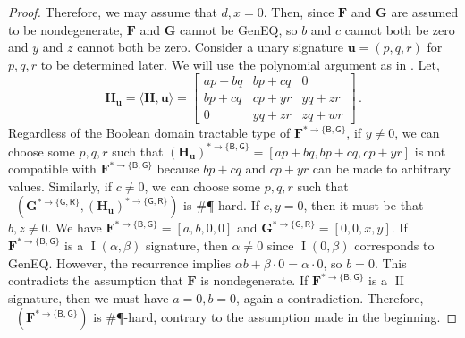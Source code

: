 \documentclass[11pt]{article}
\DeclareMathOperator{\holbs}{Holant^*_2}
\DeclareMathOperator{\typei}{I}
\DeclareMathOperator{\typeii}{II}
\newcommand{\db}{\mathsf{B}}
\newcommand{\dg}{\mathsf{G}}
\newcommand{\dr}{\mathsf{R}}
\newcommand{\geneq}{\textsf{GenEQ}\xspace}
\newcommand{\sph}{\#\P-hard\xspace}
\newcommand{\domres}[1]{
  ^{*\to\{#1\}}
}
\begin{document}
\begin{proof}
Therefore, we may assume that $d, x = 0$.
Then, since $\mathbf{F}$ and $\mathbf{G}$ are assumed to be nondegenerate, $\mathbf{F}$ and $\mathbf{G}$ cannot be \geneq, so $b$ and $c$ cannot both be zero and $y$ and $z$ cannot both be zero.
Consider a unary signature $\mathbf{u} = (p, q, r)$ for $p, q, r$ to be determined later.
We will use the polynomial argument as in \cite{cai_dichotomy_2013}.
Let,
\[
  \mathbf{H}_{\mathbf{u}} = 
  \langle \mathbf{H}, \mathbf{u} \rangle = \begin{bmatrix}
    ap + bq & bp + cq & 0 \\
    bp + cq & cp + yr & yq + zr \\
    0 & yq + zr & zq + wr
  \end{bmatrix} \,.
\]
Regardless of the Boolean domain tractable type of $\mathbf{F}\domres{\db, \dg}$, if $y \ne 0$, we can choose some $p, q, r$ such that $(\mathbf{H}_{\mathbf{u}})\domres{\db, \dg} = [ap + bq, bp + cq, cp + yr]$ is not compatible with $\mathbf{F}\domres{\db, \dg}$ because $bp + cq$ and $cp + yr$ can be made to arbitrary values.
Similarly, if $c \ne 0$, we can choose some $p, q, r$ such that $\holbs(\mathbf{G}\domres{\dg, \dr}, (\mathbf{H}_{\mathbf{u}})\domres{\dg, \dr})$ is \sph.
If $c, y = 0$, then it must be that $b, z \ne 0$.
We have $\mathbf{F}\domres{\db, \dg} = [a, b, 0, 0]$ and $\mathbf{G}\domres{\dg, \dr} = [0, 0, x, y]$.
If $\mathbf{F}\domres{\db, \dg}$ is a $\typei(\alpha, \beta)$ signature, then $\alpha \ne 0$ since $\typei(0, \beta)$ corresponds to \geneq.
However, the recurrence implies $\alpha b + \beta \cdot 0 = \alpha \cdot 0$, so $b = 0$.
This contradicts the assumption that $\mathbf{F}$ is nondegenerate.
If $\mathbf{F}\domres{\db, \dg}$ is a $\typeii$ signature, then we must have $a = 0, b = 0$, again a contradiction.
Therefore, $\holbs(\mathbf{F}\domres{\db, \dg})$ is \sph, contrary to the assumption made in the beginning.
\end{proof}
\end{document}
